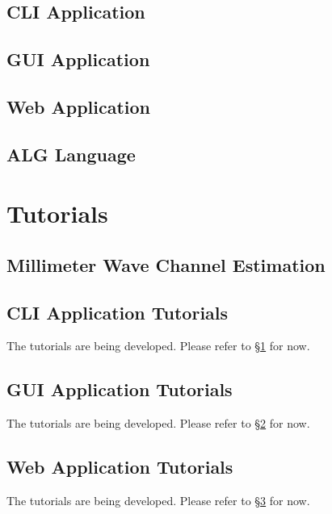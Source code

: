 \documentclass[use boldface]{beaulivre}
\begin{document}
\chapter{CLI Application}\label{d:chap:cli}


\chapter{GUI Application}\label{d:chap:gui}


\chapter{Web Application}\label{d:chap:web}


\chapter{ALG Language}\label{d:chap:alg_lang}


\part{Tutorials}

\chapter{Millimeter Wave Channel Estimation}


\chapter{CLI Application Tutorials}
The tutorials are being developed.
Please refer to \S\ref{d:chap:cli} for now.

\chapter{GUI Application Tutorials}
The tutorials are being developed.
Please refer to \S\ref{d:chap:gui} for now.

\chapter{Web Application Tutorials}
The tutorials are being developed.
Please refer to \S\ref{d:chap:web} for now.
\end{document}
